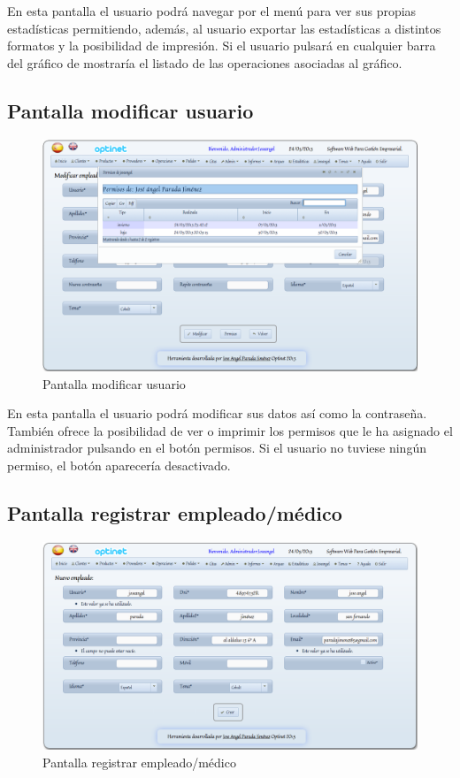 \documentclass[a4paper,11pt]{book}
\begin{document}
En esta pantalla el usuario podrá navegar por el menú para ver sus propias estadísticas permitiendo, además, al usuario exportar las estadísticas a distintos formatos y la posibilidad de impresión. Si el usuario pulsará en cualquier barra del gráfico de mostraría el listado de las operaciones asociadas al gráfico.

\newpage
\subsection {Pantalla modificar usuario}

\begin{figure}[!htb]
  \centering
    \includegraphics[scale=0.35]{capmodificarempleado.png}
  \caption{Pantalla modificar usuario}
  \label{a}
\end{figure}

En esta pantalla el usuario podrá modificar sus datos así como la contraseña. También ofrece la posibilidad de ver o imprimir los permisos que le ha asignado el administrador pulsando en el botón permisos. Si el usuario no tuviese ningún permiso, el botón aparecería desactivado.

\newpage
\subsection {Pantalla registrar empleado/médico}

\begin{figure}[!htb]
  \centering
    \includegraphics[scale=0.35]{capregistroemp.png}
  \caption{Pantalla registrar empleado/médico}
  \label{a}
\end{figure}
\end{document}
